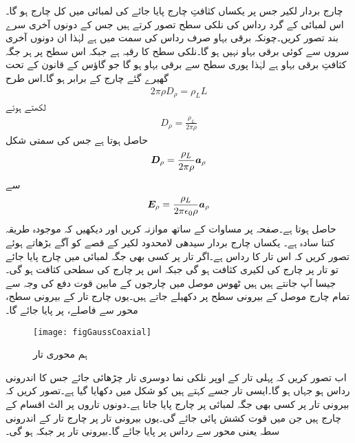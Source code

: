 چارج بردار لکیر جس پر یکساں کثافتِ چارج  پایا جائے  کی لمبائی  میں کل چارج  ہو گا۔اس لمبائی کے گرد  رداس کی نلکی سطح تصور کرتے ہیں جس کے دونوں آخری سرے بند تصور کریں۔چونکہ برقی بہاو صرف رداس کی سمت میں ہے لہٰذا ان دونوں آخری سروں سے کوئی برقی بہاو نہیں ہو گا۔نلکی سطح کا رقبہ  ہے جبکہ اس سطح پر ہر جگہ کثافتِ برقی بہاو   ہے لہٰذا پوری سطح سے  برقی بہاو ہو گا جو گاؤس کے قانون کے تحت گھیرے گئے چارج  کے برابر ہو گا۔اس طرح
\begin{align*}
2 \pi \rho D_{\rho} = \rho_L L
\end{align*}
لکھتے ہوئے
\begin{align*}
D_{\rho}=\frac{\rho_L}{2\pi \rho}
\end{align*}
حاصل ہوتا ہے جس کی سمتی شکل
\begin{align}\label{مساوات_گاؤس_لکیری_کثافت_کا_میدان}
{\ensuremath{{\boldsymbol{D}}}}_\rho=\frac{\rho_L}{2\pi \rho} {\boldsymbol{a}}_{\rho}
\end{align}
سے 
\begin{align}\label{مساوات_گاؤس_لکیری_چارج_کا_میدان}
{\ensuremath{{\boldsymbol{E}}}}_\rho=\frac{\rho_L}{2\pi \epsilon_0\rho} {\boldsymbol{a}}_{\rho}
\end{align}
حاصل ہوتا ہے۔صفحہ  پر مساوات  کے ساتھ موازنہ کریں اور دیکھیں کہ موجودہ طریقہ کتنا سادہ ہے۔
یکساں چارج بردار سیدھی لامحدود لکیر کے قصے کو آگے بڑھاتے ہوئے تصور کریں کہ اس تار کا رداس  ہے۔اگر تار پر کسی بھی  جگہ  لمبائی میں  چارج پایا جائے تو تار پر چارج کی لکیری کثافت   ہو گی جبکہ اس پر چارج کی سطحی کثافت  ہو گی۔جیسا آپ جانتے ہیں ہیں ٹھوس موصل میں چارجوں کے مابین قوت دفع کی وجہ سے تمام  چارج موصل کے بیرونی سطح پر دکھیلے جاتے ہیں۔یوں چارج  تار  کے  بیرونی سطح، محور سے  فاصلے، پر پایا جائے گا۔

\begin{figure}
\centering
\texttt{[image: figGaussCoaxial]}
\caption{ہم محوری تار}
\label{شکل_گاؤس_ہم_محوری_تار}
\end{figure}

اب تصور کریں کہ پہلی تار کے اوپر نلکی نما دوسری تار چڑھائی جائے جس کا اندرونی رداس  ہو جہاں  ہو گا۔ایسی تار جسے  کہتے ہیں کو شکل  میں دکھایا گیا ہے۔تصور کریں کہ بیرونی تار پر کسی بھی جگہ  لمبائی پر  چارج پایا جاتا ہے۔دونوں تاروں پر الٹ اقسام کے چارج ہیں جن میں قوت کشش پائی جائے گی۔یوں بیرونی تار پر چارج تار کے اندرونی سطہ یعنی محور سے  رداس پر پایا جائے گا۔بیرونی تار پر  جبکہ  ہو گی۔


